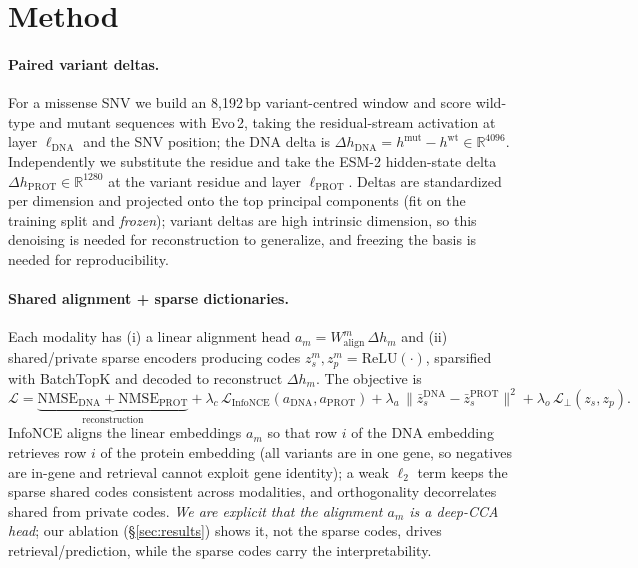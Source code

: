 \documentclass[10pt]{article}
\begin{document}
\section{Method}
\label{sec:method}
\paragraph{Paired variant deltas.} For a missense SNV we build an 8{,}192\,bp variant-centred
window and score wild-type and mutant sequences with Evo\,2, taking the residual-stream
activation at layer $\ell_{\mathrm{DNA}}$ and the SNV position; the DNA delta is
$\Delta h_{\mathrm{DNA}}=h^{\text{mut}}-h^{\text{wt}}\in\mathbb{R}^{4096}$. Independently we
substitute the residue and take the ESM-2 hidden-state delta $\Delta h_{\mathrm{PROT}}\in
\mathbb{R}^{1280}$ at the variant residue and layer $\ell_{\mathrm{PROT}}$. Deltas are
standardized per dimension and projected onto the top \npca{} principal components (fit on the
training split and \emph{frozen}); variant deltas are high intrinsic dimension, so this
denoising is needed for reconstruction to generalize, and freezing the basis is needed for
reproducibility.

\paragraph{Shared alignment + sparse dictionaries.} Each modality has (i) a linear alignment
head $a_m=W^m_{\mathrm{align}}\,\Delta h_m$ and (ii) shared/private sparse encoders producing
codes $z^m_s,z^m_p=\mathrm{ReLU}(\cdot)$, sparsified with BatchTopK \citep{bussmann2024batchtopk}
and decoded to reconstruct $\Delta h_m$. The objective is
\[
\mathcal{L}=\underbrace{\mathrm{NMSE}_{\mathrm{DNA}}+\mathrm{NMSE}_{\mathrm{PROT}}}_{\text{reconstruction}}
+\lambda_c\,\mathcal{L}_{\text{InfoNCE}}(a_{\mathrm{DNA}},a_{\mathrm{PROT}})
+\lambda_a\,\lVert\bar z^{\mathrm{DNA}}_s-\bar z^{\mathrm{PROT}}_s\rVert^2
+\lambda_o\,\mathcal{L}_{\perp}(z_s,z_p).
\]
InfoNCE aligns the linear embeddings $a_m$ so that row $i$ of the DNA embedding retrieves row $i$
of the protein embedding (all variants are in one gene, so negatives are in-gene and retrieval
cannot exploit gene identity); a weak $\ell_2$ term keeps the sparse shared codes consistent
across modalities, and orthogonality decorrelates shared from private codes. \emph{We are
explicit that the alignment $a_m$ is a deep-CCA head}; our ablation (\S\ref{sec:results}) shows
it, not the sparse codes, drives retrieval/prediction, while the sparse codes carry the
interpretability.
\end{document}
